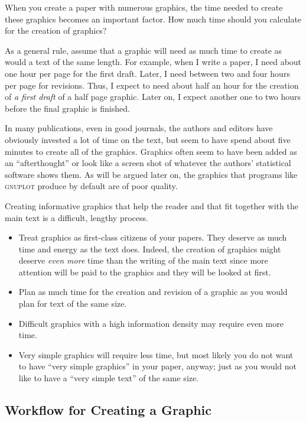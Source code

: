 When you create a paper with numerous graphics, the time needed to create these
graphics becomes an important factor. How much time should you calculate for
the creation of graphics?

As a general rule, assume that a graphic will need as much time to create as
would a text of the same length. For example, when I write a paper, I need
about one hour per page for the first draft. Later, I need between two and four
hours per page for revisions. Thus, I expect to need about half an hour for the
creation of \emph{a first draft} of a half page graphic. Later on, I expect
another one to two hours before the final graphic is finished.

In many publications, even in good journals, the authors and editors have
obviously invested a lot of time on the text, but seem to have spend about
five minutes to create all of the graphics. Graphics often seem to have been
added as an ``afterthought'' or look like a screen shot of whatever the
authors' statistical software shows them. As will be argued later on, the
graphics that programs like \textsc{gnuplot} produce by default are of poor
quality.

Creating informative graphics that help the reader and that fit together with
the main text is a difficult, lengthy process.
%
\begin{itemize}
    \item Treat graphics as first-class citizens of your papers. They deserve
        as much time and energy as the text does. Indeed, the creation of
        graphics might deserve \emph{even more} time than the writing of the
        main text since more attention will be paid to the graphics and they
        will be looked at first.
    \item Plan as much time for the creation and revision of a graphic as you
        would plan for text of the same size.
    \item Difficult graphics with a high information density may require even
        more time.
    \item Very simple graphics will require less time, but most likely you do
        not want to have ``very simple graphics'' in your paper, anyway; just
        as you would not like to have a ``very simple text'' of the same
        size.
\end{itemize}


\subsection{Workflow for Creating a Graphic}

